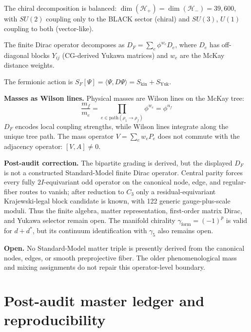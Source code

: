 \documentclass[12pt,a4paper]{article}
\theoremstyle{definition}
\begin{document}
The chiral decomposition is balanced: $\dim(\mathcal{H}_+) = \dim(\mathcal{H}_-) = 39{,}600$, with $SU(2)$ coupling only to the BLACK sector (chiral) and $SU(3)$, $U(1)$ coupling to both (vector-like).

The finite Dirac operator decomposes as $D_F = \sum_e \phi^{w_e} D_e$, where $D_e$ has off-diagonal blocks $Y_{ij}$ (CG-derived Yukawa matrices) and $w_e$ are the McKay distance weights.

The fermionic action is $S_F[\Psi] = \langle \Psi, D \Psi \rangle = S_{\mathrm{kin}} + S_{\mathrm{Yuk}}$.

\textbf{Masses as Wilson lines.}  Physical masses are Wilson lines on the McKay tree:
\begin{equation}
\frac{m_f}{m_e} = \prod_{e \in \mathrm{path}(\rho_1 \to \rho_f)} \phi^{w_e} = \phi^{n_f}
\end{equation}
$D_F$ encodes local coupling strengths, while Wilson lines integrate along the unique tree path.  The mass operator $V = \sum_e w_e P_e$ does not commute with the adjacency operator: $[V, A] \neq 0$.

\textbf{Post-audit correction.}  The bipartite grading is derived, but the displayed $D_F$ is not a constructed Standard-Model finite Dirac operator.  Central parity forces every fully $2I$-equivariant odd operator on the canonical node, edge, and regular-fiber routes to vanish; after reduction to $C_3$ only a residual-equivariant Krajewski-legal block candidate is known, with 122 generic gauge-plus-scale moduli.  Thus the finite algebra, matter representation, first-order matrix Dirac, and Yukawa selector remain open.  The manifold chirality $\gamma_{\mathrm{form}}=(-1)^p$ is valid for $d+d^*$, but its continuum identification with $\gamma_5$ also remains open.

\textbf{Open.}  No Standard-Model matter triple is presently derived from the canonical nodes, edges, or smooth preprojective fiber.  The older phenomenological mass and mixing assignments do not repair this operator-level boundary.

\section{Post-audit master ledger and reproducibility}
\label{sec:S-audited-ledger}
\end{document}
